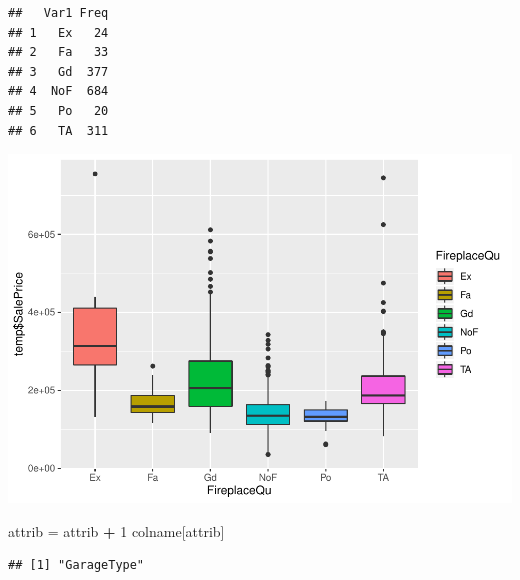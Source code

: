 \documentclass[]{article}
\newenvironment{Shaded}{\begin{snugshade}}{\end{snugshade}}
\newcommand{\DecValTok}[1]{\textcolor[rgb]{0.00,0.00,0.81}{#1}}
\newcommand{\StringTok}[1]{\textcolor[rgb]{0.31,0.60,0.02}{#1}}
\newcommand{\OperatorTok}[1]{\textcolor[rgb]{0.81,0.36,0.00}{\textbf{#1}}}
\newcommand{\NormalTok}[1]{#1}
\begin{document}
\begin{verbatim}
##   Var1 Freq
## 1   Ex   24
## 2   Fa   33
## 3   Gd  377
## 4  NoF  684
## 5   Po   20
## 6   TA  311
\end{verbatim}

\includegraphics{EDA_files/figure-latex/unnamed-chunk-80-1.pdf}

\begin{Shaded}
\begin{Highlighting}[]
\NormalTok{attrib =}\StringTok{ }\NormalTok{attrib }\OperatorTok{+}\StringTok{ }\DecValTok{1}
\NormalTok{colname[attrib]}
\end{Highlighting}
\end{Shaded}

\begin{verbatim}
## [1] "GarageType"
\end{verbatim}
\end{document}
